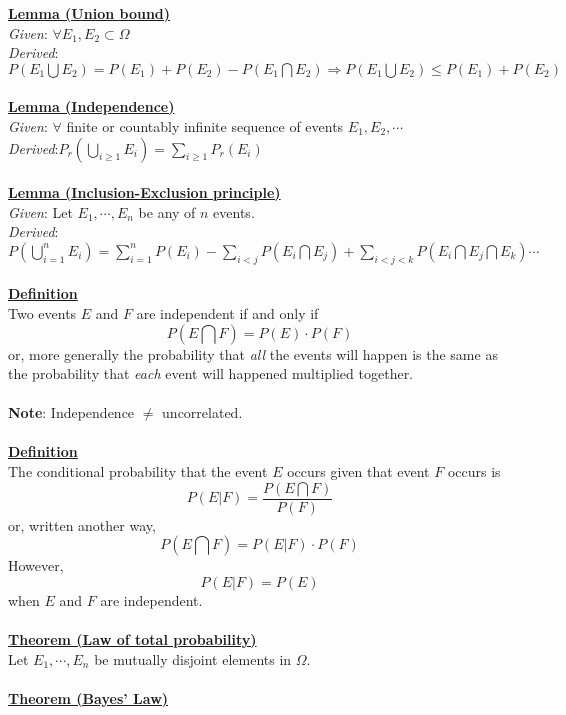 \documentclass[12pt]{article}
\newcommand{\aside}[1]{\noindent\textbf{\underline{#1}}}
\begin{document}
\aside{Lemma (Union bound)} \\
\textit{Given}: $\forall E_1, E_2 \subset \Omega$
\\
\textit{Derived}: $P(E_1 \bigcup E_2) = P(E_1) + P(E_2) - P (E_1 \bigcap E_2) \Rightarrow P(E_1 \bigcup E_2) \le P(E_1) + P(E_2)$
\\ \\
\aside{Lemma (Independence)}  \\
\textit{Given}: $\forall$ finite or countably infinite sequence of events $E_1, E_2, \cdots$
\\
\textit{Derived}:$P_r(\bigcup\limits_{i \ge 1} E_{i}) = \sum\limits_{i \ge 1}P_r(E_i)$ 
\\ \\
\aside{Lemma (Inclusion-Exclusion principle)} \\
\textit{Given}: Let $E_1, \cdots, E_n$ be any of $n$ events.
\\
\textit{Derived}: $P(\bigcup \limits_{i=1}^{n} E_i) = \sum\limits_{i=1}^{n} P(E_i) - \sum\limits_{i < j} P(E_i \bigcap E_j) + \sum\limits_{i < j < k} P(E_i \bigcap E_j \bigcap E_k) \cdots$
\\ \\
\aside{Definition} \\
Two events $E$ and $F$ are independent if and only if \[P(E \bigcap F) = P(E) \cdot P(F)\] or, more generally the probability that \textit{all} the events will happen is the same as the probability that \textit{each} event will happened multiplied together.
\\ \\
\textbf{Note}: Independence $\neq$ uncorrelated.
\\ \\
\aside{Definition} \\
The conditional probability that the event $E$ occurs given that event $F$ occurs is \[P(E | F) = \frac{P(E \bigcap F)}{P(F)}\] or, written another way, \[P(E \bigcap F) = P(E | F) \cdot P(F)\]However, \[P(E | F) = P(E)\] when $E$ and $F$ are independent. \\ \\

\aside{Theorem (Law of total probability)} \\

Let $E_1, \cdots, E_n$ be mutually disjoint elements in $\Omega$. \\ \\

\aside{Theorem (Bayes' Law)} \\
\end{document}
